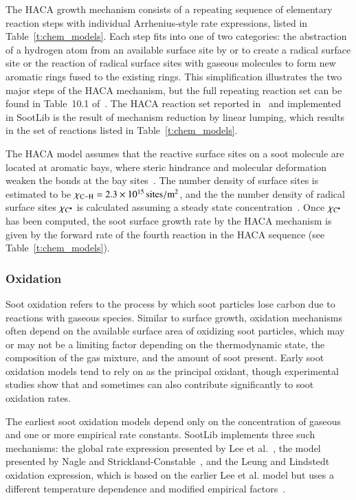 \documentclass[preprint,letterpaper]{elsarticle}
\begin{document}
The HACA growth mechanism consists of a repeating sequence of elementary reaction steps with individual Arrhenius-style rate expressions, listed in Table~\ref{t:chem_models}. Each step fits into one of two categories: the abstraction of a hydrogen atom from an available surface site by  or  to create a radical surface site or the reaction of radical surface sites with gaseous  molecules to form new aromatic rings fused to the existing rings. This simplification illustrates the two major steps of the HACA mechanism, but the full repeating reaction set can be found in Table~10.1 of~\cite{Frenklach_1994}. The HACA reaction set reported in~\cite{Appel_2000} and implemented in SootLib is the result of mechanism reduction by linear lumping, which results in the set of reactions listed in Table~\ref{t:chem_models}.

The HACA model assumes that the reactive  surface sites on a soot molecule are located at aromatic bays, where steric hindrance and molecular deformation weaken the  bonds at the bay sites~\cite{Appel_2000}. The number density of  surface sites is estimated to be $\chi_{\ce{C-H}}=\qty{2.3e15}{sites\per\square\m}$, and the the number density of radical surface sites $\chi_{\ce{C^.}}$ is calculated assuming a steady state concentration~\cite{Frenklach_1991,Appel_2000}. Once $\chi_{\ce{C^.}}$ has been computed, the soot surface growth rate by the HACA mechanism is given by the forward rate of the fourth reaction in the HACA sequence (see Table~\ref{t:chem_models}).

\subsubsection{Oxidation}
\label{s:oxi}

Soot oxidation refers to the process by which soot particles lose carbon due to reactions with gaseous species. Similar to surface growth, oxidation mechanisms often depend on the available surface area of oxidizing soot particles, which may or may not be a limiting factor depending on the thermodynamic state, the composition of the gas mixture, and the amount of soot present. Early soot oxidation models tend to rely on  as the principal oxidant, though experimental studies show that  and sometimes  can also contribute significantly to soot oxidation rates.

The earliest soot oxidation models depend only on the concentration of gaseous  and one or more empirical rate constants. SootLib implements three such mechanisms: the global rate expression presented by Lee et al.~\cite{Lee_1962}, the model presented by Nagle and Strickland-Constable~\cite{Nagle_1962}, and the Leung and Lindstedt oxidation expression, which is based on the earlier Lee et al. model but uses a different temperature dependence and modified empirical factors~\cite{Leung_1991}.
\end{document}
